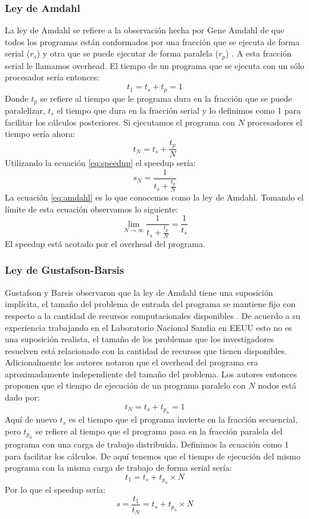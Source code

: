 \subsubsection{Ley de Amdahl}
La ley de Amdahl se refiere a la observación hecha por Gene Amdahl de que todos los programas están conformados por una fracción que se ejecuta de forma serial ($r_s$) y otra que se puede ejecutar de forma paralela ($r_p$) \cite{amdahl1967}. A esta fracción serial le llamamos overhead. El tiempo de un programa que se ejecuta con un sólo procesador sería entonces:
$$t_1 = t_s + t_p = 1$$
Donde $t_p$ se refiere al tiempo que le programa dura en la fracción que se puede paralelizar, $t_s$ el tiempo que dura en la fracción serial y lo definimos como 1 para facilitar los cálculos posteriores.
Si ejecutamos el programa con $N$ procesadores el tiempo sería ahora:
$$t_N = t_s + \frac{t_p}{N}$$
Utilizando la ecuación \ref{eq:speedup} el speedup sería:
\begin{equation}
s_N = \frac{1}{t_s + \frac{t_p}{N}}
 \label{eq:amdahl} 
\end{equation}
La ecuación \ref{eq:amdahl} es lo que conocemos como la ley de Amdahl. Tomando el límite de esta ecuación observamos lo siguiente:
$$\lim_{N\to\infty} \frac{1}{t_s + \frac{t_p}{N}} = \frac{1}{t_s}$$
El speedup está acotado por el overhead del programa.
\subsubsection{Ley de Gustafson-Barsis}
Gustafson y Barsis observaron que la ley de Amdahl tiene una suposición implícita, el tamaño del problema de entrada del programa se mantiene fijo con respecto a la cantidad de recursos computacionales disponibles \cite{Gustafson1988}. De acuerdo a su experiencia trabajando en el Laboratorio Nacional Sandia en EEUU esto no es una suposición realista, el tamaño de los problemas que los investigadores resuelven está relacionado con la cantidad de recursos que tienen disponibles. Adicionalmente los autores notaron que el overhead del programa era aproximadamente independiente del tamaño del problema. Los autores entonces proponen que el tiempo de ejecución de un programa paralelo con $N$ nodos está dado por:
$$t_N = t_s + t_{p_n} = 1$$
Aquí de nuevo $t_s$ es el tiempo que el programa invierte en la fracción secuencial, pero $t_{p_n}$ se refiere al tiempo que el programa pasa en la fracción paralela del programa con una carga de trabajo distribuida. Definimos la ecuación como 1 para facilitar los cálculos.
De aquí tenemos que el tiempo de ejecución del mismo programa con la misma carga de trabajo de forma serial sería:
$$t_1 = t_s + t_{p_n}\times N$$
Por lo que el speedup sería:
\begin{equation}
  s = \frac{t_1}{t_N} = t_s + t_{p_n}\times N
  \label{eq:gustafson}
\end{equation}

